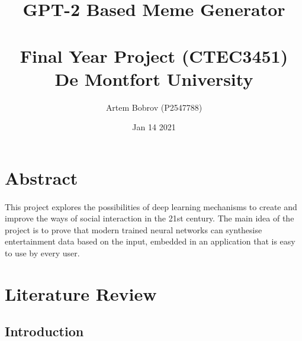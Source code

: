 \documentclass[12pt]{report}
\title{%
      GPT-2 Based Meme Generator\\~\\
      \large Final Year Project (CTEC3451) \\
        De Montfort University}
\author{Artem Bobrov (P2547788)}
\date{Jan 14 2021}
\begin{document}
    \maketitle
    \thispagestyle{empty}
    \clearpage
    \tableofcontents
    \setcounter{tocdepth}{1}
    \thispagestyle{empty}
    \clearpage
    \section*{Abstract}
    
    \paragraph{}
    
    This project explores the possibilities of deep learning mechanisms to create and improve the ways of 
    social interaction in the 21st century. The main idea of the project is to prove that modern trained neural networks can 
    synthesise entertainment data based on the input, embedded in an application that is easy to use by every user.
    
    
    \section*{Literature Review}
    \paragraph{}

    \subsection*{Introduction}
    \paragraph{}
    
\end{document}

